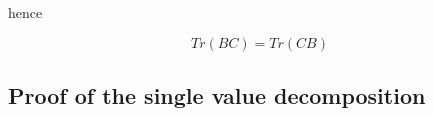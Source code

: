 \documentclass{article}
\begin{document}
    hence

    \begin{equation*}
        Tr(BC) = Tr(CB)
    \end{equation*}

    \subsection{Proof of the single value decomposition} \label{svd_existance}
\end{document}
